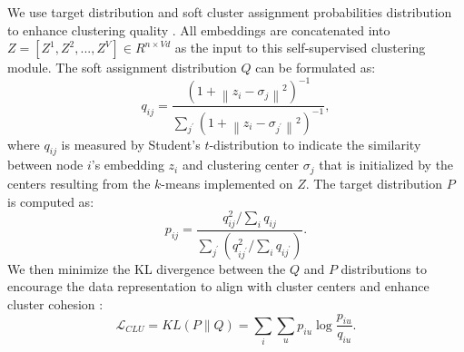 \documentclass[letterpaper]{article} %
\begin{document}
We use target distribution and soft cluster assignment probabilities distribution to enhance clustering quality \cite{tu2021deep}. All embeddings are concatenated into $Z = [Z^1, Z^2,..., Z^V]\in R^{n\times Vd}$ as the input to this self-supervised clustering module.
The soft assignment distribution $Q$ can be formulated as:
\begin{equation}\label{soft assignment}
    q_{i j}=\frac{{\left(1+\left\|z_i-\sigma_j\right\|^2\right)}^{-1}}{\sum_{j^{\prime}}\left(1+\left\|z_i-\sigma_{j^{\prime}}\right\|^2\right)^{-1}},
\end{equation}
where $q_{i j}$ is measured by Student's $t$-distribution to indicate the similarity between node $i$'s embedding $z_i$ and clustering center $\sigma_j$ that is initialized by the centers resulting from the $k$-means implemented on $Z$.
The target distribution $P$ is computed as:
\begin{equation}\label{target distribution}
    p_{i j}=\frac{q_{i j}^2 / \sum_i q_{i j}}{\sum_{j^{\prime}}\left(q_{i j^{\prime}}^2 / \sum_i q_{i j^{\prime}}\right)}. 
\end{equation}
We then minimize the KL divergence between the $Q$ and $P$ distributions to encourage the data representation to align with cluster centers and enhance cluster cohesion \cite{kullback1951information}:
\begin{equation}\label{loss: clu}
    \mathcal{L}_{C L U}=K L(P \| Q)=\sum_i \sum_u p_{i u} \log \frac{p_{i u}}{q_{i u}}.
\end{equation}
\end{document}
